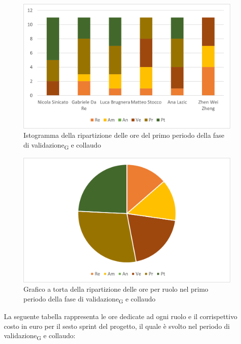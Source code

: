 \begin{figure}[H]
    \centering
    \includegraphics[scale=0.6]{img/grafi preventivo/istogrammi/validazione/periodo1.png}
    \caption{Istogramma della ripartizione delle ore del primo periodo della fase di validazione\textsubscript{G} e collaudo}
\end{figure}
\begin{figure}[H]
    \centering
    \includegraphics[scale=0.6]{img/grafi preventivo/torta/validazione/periodo1.png}
    \caption{Grafico a torta della ripartizione delle ore per ruolo nel primo periodo della fase di validazione\textsubscript{G} e collaudo}
\end{figure}
La seguente tabella rappresenta le ore dedicate ad ogni ruolo e il corrispettivo costo in euro per il sesto sprint del progetto, il quale è svolto nel periodo di validazione\textsubscript{G} e collaudo:

